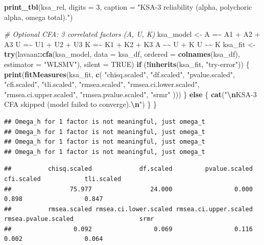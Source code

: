 \documentclass[
  10pt,
]{article}
\newenvironment{Shaded}{\begin{snugshade}}{\end{snugshade}}
\newcommand{\AttributeTok}[1]{\textcolor[rgb]{0.13,0.29,0.53}{#1}}
\newcommand{\CommentTok}[1]{\textcolor[rgb]{0.56,0.35,0.01}{\textit{#1}}}
\newcommand{\ConstantTok}[1]{\textcolor[rgb]{0.56,0.35,0.01}{#1}}
\newcommand{\ControlFlowTok}[1]{\textcolor[rgb]{0.13,0.29,0.53}{\textbf{#1}}}
\newcommand{\DecValTok}[1]{\textcolor[rgb]{0.00,0.00,0.81}{#1}}
\newcommand{\FunctionTok}[1]{\textcolor[rgb]{0.13,0.29,0.53}{\textbf{#1}}}
\newcommand{\NormalTok}[1]{#1}
\newcommand{\OtherTok}[1]{\textcolor[rgb]{0.56,0.35,0.01}{#1}}
\newcommand{\SpecialCharTok}[1]{\textcolor[rgb]{0.81,0.36,0.00}{\textbf{#1}}}
\newcommand{\StringTok}[1]{\textcolor[rgb]{0.31,0.60,0.02}{#1}}
\begin{document}
\begin{Shaded}
\begin{Highlighting}[]
  \FunctionTok{print\_tbl}\NormalTok{(ksa\_rel, }\AttributeTok{digits =} \DecValTok{3}\NormalTok{, }\AttributeTok{caption =} \StringTok{"KSA{-}3 reliability (alpha, polychoric alpha, omega total)."}\NormalTok{)}

  \CommentTok{\# Optional CFA: 3 correlated factors (A, U, K)}
\NormalTok{  ksa\_model }\OtherTok{\textless{}{-}} \StringTok{\textquotesingle{}}
\StringTok{  A =\textasciitilde{} A1 + A2 + A3}
\StringTok{  U =\textasciitilde{} U1 + U2 + U3}
\StringTok{  K =\textasciitilde{} K1 + K2 + K3}
\StringTok{  A \textasciitilde{}\textasciitilde{} U + K}
\StringTok{  U \textasciitilde{}\textasciitilde{} K}
\StringTok{  \textquotesingle{}}
\NormalTok{  ksa\_fit }\OtherTok{\textless{}{-}} \FunctionTok{try}\NormalTok{(lavaan}\SpecialCharTok{::}\FunctionTok{cfa}\NormalTok{(ksa\_model, }\AttributeTok{data =}\NormalTok{ ksa\_df, }\AttributeTok{ordered =} \FunctionTok{colnames}\NormalTok{(ksa\_df), }\AttributeTok{estimator =} \StringTok{"WLSMV"}\NormalTok{), }\AttributeTok{silent =} \ConstantTok{TRUE}\NormalTok{)}
  \ControlFlowTok{if}\NormalTok{ (}\SpecialCharTok{!}\FunctionTok{inherits}\NormalTok{(ksa\_fit, }\StringTok{"try{-}error"}\NormalTok{)) \{}
    \FunctionTok{print}\NormalTok{(}\FunctionTok{fitMeasures}\NormalTok{(ksa\_fit, }\FunctionTok{c}\NormalTok{(}
      \StringTok{"chisq.scaled"}\NormalTok{, }\StringTok{"df.scaled"}\NormalTok{, }\StringTok{"pvalue.scaled"}\NormalTok{, }\StringTok{"cfi.scaled"}\NormalTok{,}
      \StringTok{"tli.scaled"}\NormalTok{, }\StringTok{"rmsea.scaled"}\NormalTok{, }\StringTok{"rmsea.ci.lower.scaled"}\NormalTok{,}
      \StringTok{"rmsea.ci.upper.scaled"}\NormalTok{, }\StringTok{"rmsea.pvalue.scaled"}\NormalTok{, }\StringTok{"srmr"}
\NormalTok{    )))}
\NormalTok{  \} }\ControlFlowTok{else}\NormalTok{ \{}
    \FunctionTok{cat}\NormalTok{(}\StringTok{"}\SpecialCharTok{\textbackslash{}n}\StringTok{KSA{-}3 CFA skipped (model failed to converge).}\SpecialCharTok{\textbackslash{}n}\StringTok{"}\NormalTok{)}
\NormalTok{  \}}
\NormalTok{\}}
\end{Highlighting}
\end{Shaded}

\begin{verbatim}
## Omega_h for 1 factor is not meaningful, just omega_t
## Omega_h for 1 factor is not meaningful, just omega_t
## Omega_h for 1 factor is not meaningful, just omega_t
## Omega_h for 1 factor is not meaningful, just omega_t
\end{verbatim}

\begin{verbatim}
##          chisq.scaled             df.scaled         pvalue.scaled            cfi.scaled            tli.scaled
##                75.977                24.000                 0.000                 0.898                 0.847
##          rmsea.scaled rmsea.ci.lower.scaled rmsea.ci.upper.scaled   rmsea.pvalue.scaled                  srmr
##                 0.092                 0.069                 0.116                 0.002                 0.064
\end{verbatim}
\end{document}
